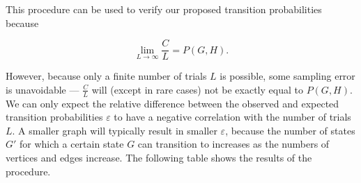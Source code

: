 \documentclass[a4paper,10pt]{article}
\begin{document}
This procedure can be used to verify our proposed transition probabilities because

\begin{equation}
 \lim_{L \to \infty} \frac{C}{L} = P(G, H).
\end{equation}

However, because only a finite number of trials $L$ is possible, some sampling error is unavoidable --- $\frac{C}{L}$ will (except in rare cases) not be exactly equal to $P(G, H)$. We can only expect the relative difference between the observed and expected transition probabilities $\varepsilon$ to have a negative correlation with the number of trials $L$. A smaller graph will typically result in smaller $\varepsilon$, because the number of states $G'$ for which a certain state $G$ can transition to increases as the numbers of vertices and edges increase. The following table shows the results of the procedure. 

\begin{table}[H]
\centering
{}
\qquad
{}
\caption{The results of several executions of the procedure on states with 4 vertices and 2 edges. An arbitrarily chosen $I$-value of $0.5$ was used. The same states $G$ and $H$ were used for each execution. The very low $\varepsilon$ values for $L = 10^5$ and the negative correlation between $\varepsilon$ and $L$ provide evidence that the expressions we derived for $P(G, H)$ are valid.}
\end{table}
\end{document}
